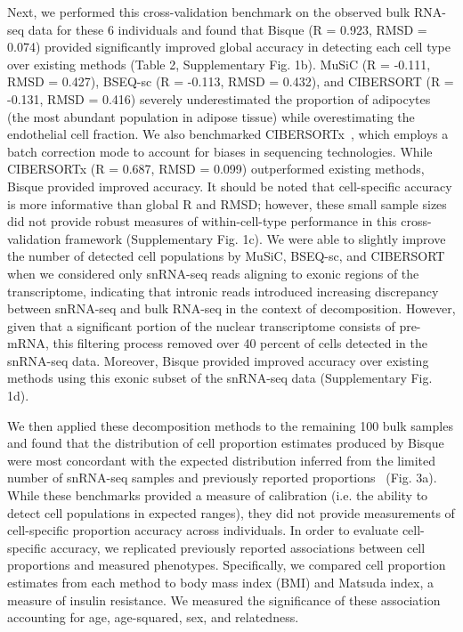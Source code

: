 Next, we performed this cross-validation benchmark on the observed bulk RNA-seq data for these 6 individuals and found that Bisque (R = 0.923, RMSD = 0.074) provided significantly improved global accuracy in detecting each cell type over existing methods (Table 2, Supplementary Fig. 1b). MuSiC (R = -0.111, RMSD = 0.427), BSEQ-sc (R = -0.113, RMSD = 0.432), and CIBERSORT (R = -0.131, RMSD = 0.416) severely underestimated the proportion of adipocytes (the most abundant population in adipose tissue) while overestimating the endothelial cell fraction. We also benchmarked CIBERSORTx~\cite{Newman2019-mq}, which employs a batch correction mode to account for biases in sequencing technologies. While CIBERSORTx (R = 0.687, RMSD = 0.099) outperformed existing methods, Bisque provided improved accuracy. It should be noted that cell-specific accuracy is more informative than global R and RMSD; however, these small sample sizes did not provide robust measures of within-cell-type performance in this cross-validation framework (Supplementary Fig. 1c). We were able to slightly improve the number of detected cell populations by MuSiC, BSEQ-sc, and CIBERSORT when we considered only snRNA-seq reads aligning to exonic regions of the transcriptome, indicating that intronic reads introduced increasing discrepancy between snRNA-seq and bulk RNA-seq in the context of decomposition. However, given that a significant portion of the nuclear transcriptome consists of pre-mRNA, this filtering process removed over 40 percent of cells detected in the snRNA-seq data. Moreover, Bisque provided improved accuracy over existing methods using this exonic subset of the snRNA-seq data (Supplementary Fig. 1d). 

We then applied these decomposition methods to the remaining 100 bulk samples and found that the distribution of cell proportion estimates produced by Bisque were most concordant with the expected distribution inferred from the limited number of snRNA-seq samples and previously reported proportions~\cite{Rosen2014-ae,Glastonbury_undated-kk} (Fig. 3a). While these benchmarks provided a measure of calibration (i.e. the ability to detect cell populations in expected ranges), they did not provide measurements of cell-specific proportion accuracy across individuals. In order to evaluate cell-specific accuracy, we replicated previously reported associations between cell proportions and measured phenotypes. Specifically, we compared cell proportion estimates from each method to body mass index (BMI) and Matsuda index, a measure of insulin resistance. We measured the significance of these association accounting for age, age-squared, sex, and relatedness.

